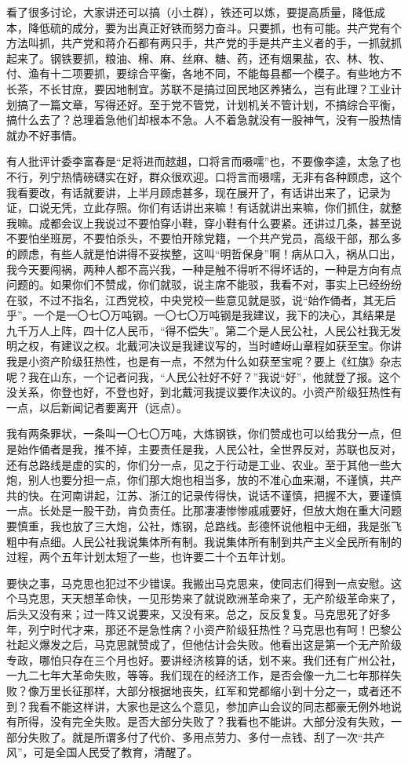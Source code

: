 看了很多讨论，大家讲还可以搞（小土群），铁还可以炼，要提高质量，降低成本，降低硫的成分，要为出真正好铁而努力奋斗。只要抓，也有可能。共产党有个方法叫抓，共产党和蒋介石都有两只手，共产党的手是共产主义者的手，一抓就抓起来了。钢铁要抓，粮油、棉、麻、丝麻、糖、药，还有烟果盐，农、林、牧、付、渔有十二项要抓，要综合平衡，各地不同，不能每县都一个模子。有些地方不长茶，不长甘庶，要因地制宜。苏联不是搞过回民地区养猪么，岂有此理？工业计划搞了一篇文章，写得还好。至于党不管党，计划机关不管计划，不搞综合平衡，搞什么去了？总理着急他们却根本不急。人不着急就没有一股神气，没有一股热情就办不好事情。

有人批评计委李富春是“足将进而趑趄，口将言而嗫嚅”也，不要像李逵，太急了也不行，列宁热情磅礴实在好，群众很欢迎。口将言而嗫嚅，无非有各种顾虑，这个我看要改，有话就要讲，上半月顾虑甚多，现在展开了，有话讲出来了，记录为证，口说无凭，立此存照。你们有话讲出来嘛！有话就讲出来嘛，你们抓住，就整我嘛。成都会议上我说过不要怕穿小鞋，穿小鞋有什么要紧。还讲过几条，甚至说不要怕坐班房，不要怕杀头，不要怕开除党籍，一个共产党员，高级干部，那么多的顾虑，有些人就是怕讲得不妥挨整，这叫“明哲保身”啊！病从口入，祸从口出，我今天要闯祸，两种人都不高兴我，一种是触不得听不得坏话的，一种是方向有点问题的。如果你们不赞成，你们就驳，说主席不能驳，我看不对，事实上已经纷纷在驳，不过不指名，江西党校，中央党校一些意见就是驳，说“始作俑者，其无后乎”。一个是一〇七〇万吨钢。一〇七〇万吨钢是我建议，我下的决心，其结果是九千万人上阵，四十亿人民币，“得不偿失”。第二个是人民公社，人民公社我无发明之权，有建议之权。北戴河决议是我建议写的，当时嵖岈山章程如获至宝。你讲我是小资产阶级狂热性，也是有一点，不然为什么如获至宝呢？要上《红旗》杂志呢？我在山东，一个记者问我，“人民公社好不好？”我说“好”，他就登了报。这个没关系，你登也好，不登也好，到北戴河我提议要作决议的。小资产阶级狂热性有一点，以后新闻记者要离开（远点）。

我有两条罪状，一条叫一〇七〇万吨，大炼钢铁，你们赞成也可以给我分一点，但是始作俑者是我，推不掉，主要责任是我，人民公社，全世界反对，苏联也反对，还有总路线是虚的实的，你们分一点，见之于行动是工业、农业。至于其他一些大炮，别人也要分担一点，你们那大炮也相当多，放的不准心血来潮，不谨慎，共产共的快。在河南讲起，江苏、浙江的记录传得快，说话不谨慎，把握不大，要谨慎一点。长处是一股干劲，肯负责任。比那凄凄惨惨戚戚要好，但放大炮在重大问题要慎重，我也放了三大炮，公社，炼钢，总路线。彭德怀说他粗中无细，我是张飞粗中有点细。人民公社我说集体所有制。我说集体所有制到共产主义全民所有制的过程，两个五年计划太短了一些，也许要二十个五年计划。

要快之事，马克思也犯过不少错误。我搬出马克思来，使同志们得到一点安慰。这个马克思，天天想革命快，一见形势来了就说欧洲革命来了，无产阶级革命来了，后头又没有来；过一阵又说要来，又没有来。总之，反反复复。马克思死了好多年，列宁时代才来，那还不是急性病？小资产阶级狂热性？马克思也有呵！巴黎公社起义爆发之后，马克思就赞成了，但他估计会失败。他看出这是第一个无产阶级专政，哪怕只存在三个月也好。要讲经济核算的话，划不来。我们还有广州公社，一九二七年大革命失败，等等。我们现在的经济工作，是否会像一九二七年那样失败？像万里长征那样，大部分根据地丧失，红军和党都缩小到十分之一，或者还不到？我看不能这样讲，大家也是这么个意见，参加庐山会议的同志都豪无例外地说有所得，没有完全失败。是否大部分失败了？我看也不能讲。大部分没有失败，一部分失败了。就是所谓多付了代价、多用点劳力、多付一点钱、刮了一次“共产风”，可是全国人民受了教育，清醒了。

